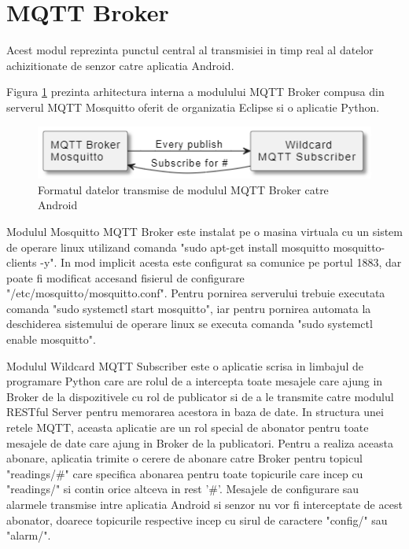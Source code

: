 \section{MQTT Broker}\label{sec:pi_mqttbroker}
Acest modul reprezinta punctul central al transmisiei in timp real al datelor achizitionate de senzor catre aplicatia Android.

Figura \ref{fig:MQTTBrokerInside} prezinta arhitectura interna a modulului MQTT Broker compusa din serverul MQTT Mosquitto oferit de organizatia Eclipse si o aplicatie 
Python.
\begin{figure}[H]
    \centering
    \includegraphics[scale=0.8]{figs/MQTTBrokerInside.png}
    \caption{Formatul datelor transmise de modulul MQTT Broker catre Android}
    \label{fig:MQTTBrokerInside}
\end{figure}

Modulul Mosquitto MQTT Broker este instalat pe o masina virtuala cu un sistem de operare linux utilizand comanda "sudo apt-get install mosquitto mosquitto-clients -y". 
In mod implicit acesta este configurat sa comunice pe portul 1883, dar poate fi modificat accesand fisierul de configurare "/etc/mosquitto/mosquitto.conf". Pentru 
pornirea serverului trebuie executata comanda "sudo systemctl start mosquitto", iar pentru pornirea automata la deschiderea sistemului de operare linux se executa 
comanda "sudo systemctl enable mosquitto".

Modulul Wildcard MQTT Subscriber este o aplicatie scrisa in limbajul de programare Python care are rolul de a intercepta toate mesajele care ajung in Broker de la dispozitivele 
cu rol de publicator si de a le transmite catre modulul RESTful Server pentru memorarea acestora in baza de date. In structura unei retele MQTT, aceasta aplicatie are un rol 
special de abonator pentru toate mesajele de date care ajung in Broker de la publicatori. Pentru a realiza aceasta abonare, aplicatia trimite o cerere de abonare catre 
Broker pentru topicul "readings/\#" care specifica abonarea pentru toate topicurile care incep cu "readings/" si contin orice altceva in rest '\#'. Mesajele de configurare 
sau alarmele transmise intre aplicatia Android si senzor nu vor fi interceptate de acest abonator, doarece topicurile respective incep cu sirul de caractere "config/" sau 
"alarm/".

